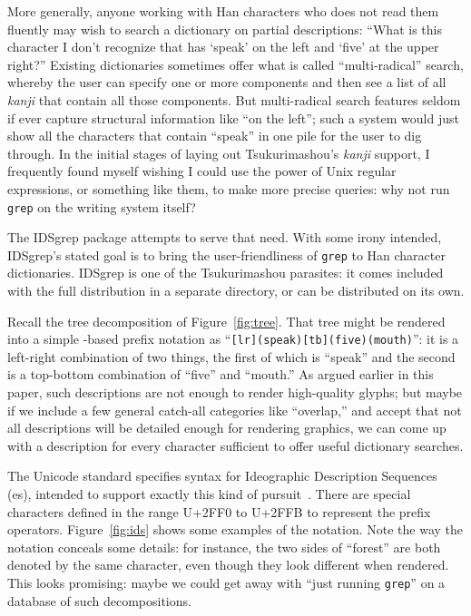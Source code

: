 \documentclass{ltugboat}
\begin{document}
More generally, anyone working with Han characters who does not read them
fluently may wish to search a dictionary on partial descriptions: ``What
is this character I don't recognize that has `speak' on the left and `five'
at the upper right?'' Existing dictionaries sometimes offer what is called
``multi-radical'' search, whereby the user can specify one or more
components and then see a list of all \emph{kanji} that contain all those
components.  But multi-radical search features seldom if ever capture
structural information like ``on the left''; such a system would just show
all the characters that contain ``speak'' in one pile for the user to dig
through.  In the initial stages of laying out Tsukurimashou's \emph{kanji}
support, I frequently found myself wishing I could use the power of Unix
regular expressions, or something like them, to make more precise queries:
why not run \verb|grep| on the writing system itself?

The IDSgrep package attempts to serve that need.  With some irony intended,
IDSgrep's stated goal is to bring the user-friendliness of \verb|grep| to
Han character dictionaries.  IDSgrep is one of the Tsukurimashou parasites:
it comes included with the full distribution in a separate directory, or can
be distributed on its own.

Recall the tree decomposition of Figure~\ref{fig:tree}.  That tree might be
rendered into a simple -based prefix notation as
``\verb|[lr](speak)[tb](five)(mouth)|'':  it is a left-right combination of
two things, the first of which is ``speak'' and the second is a top-bottom
combination of ``five'' and ``mouth.''  As argued earlier in this paper,
such descriptions are not enough to render high-quality glyphs; but maybe if
we include a few general catch-all categories like ``overlap,'' and accept
that not all descriptions will be detailed enough for rendering graphics, we
can come up with a description for every character sufficient to offer
useful dictionary searches.

The Unicode standard specifies syntax for Ideographic Description Sequences
(es), intended to support exactly this kind of
pursuit~\cite{Unicode:IDS}.  There are special characters defined in the
range U+2FF0 to U+2FFB to represent the prefix operators. 
Figure~\ref{fig:ids} shows some examples of the notation.  Note the way the
 notation conceals some details: for instance, the two sides of
``forest'' are both denoted by the same character, even though they look
different when rendered.  This looks promising:  maybe we could get away
with ``just running \verb|grep|'' on a database of such decompositions.
\end{document}
